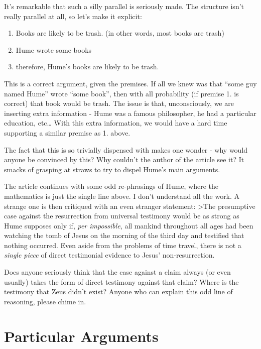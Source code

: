 It's remarkable that such a silly parallel is seriously made. The
structure isn't really parallel at all, so let's make it explicit:

\begin{enumerate}
\def\labelenumi{\arabic{enumi}.}
\itemsep1pt\parskip0pt
\item
  Books are likely to be trash. (in other words, most books are trash)
\item
  Hume wrote some books
\item
  therefore, Hume's books are likely to be trash.
\end{enumerate}

This is a correct argument, given the premises. If all we knew was that
``some guy named Hume'' wrote ``some book'', then with all probability
(if premise 1. is correct) that book would be trash. The issue is that,
unconsciously, we are inserting extra information - Hume was a famous
philosopher, he had a particular education, etc\ldots{} With this extra
information, we would have a hard time supporting a similar premise as
1. above.

The fact that this is so trivially dispensed with makes one wonder - why
would anyone be convinced by this? Why couldn't the author of the
article see it? It smacks of grasping at straws to try to dispel Hume's
main arguments.

The article continues with some odd re-phrasings of Hume, where the
mathematics is just the single line above. I don't understand all the
work. A strange one is then critiqued with an even stranger statement:
\textgreater{}The presumptive case against the resurrection from
universal testimony would be as strong as Hume supposes only if,
\emph{per impossible}, all mankind throughout all ages had been watching
the tomb of Jesus on the morning of the third day and testified that
nothing occurred. Even aside from the problems of time travel, there is
not a \emph{single piece} of direct testimonial evidence to Jesus'
non-resurrection.

Does anyone seriously think that the case against a claim always (or
even usually) takes the form of direct testimony against that claim?
Where is the testimony that Zeus didn't exist? Anyone who can explain
this odd line of reasoning, please chime in.

\section{Particular Arguments}\label{particular-arguments}

